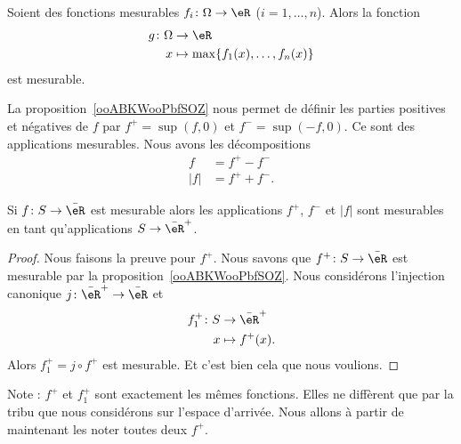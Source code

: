 \begin{lemma}   \label{LEMooMGUOooMGwknZ}
	Soient des fonctions mesurables \(f_i \colon \Omega\to \eR  \) (\( i=1,\ldots,n\)). Alors la fonction
	\begin{equation}
		\begin{aligned}
			g\colon \Omega & \to \eR                                \\
			x              & \mapsto \max\{ f_1(x),\ldots,f_n(x) \}
		\end{aligned}
	\end{equation}
	est mesurable.
\end{lemma}

\begin{normaltext}
	La proposition~\ref{ooABKWooPbfSOZ} nous permet de définir les parties positives et négatives de \( f\) par \( f^+=\sup(f,0)\) et \( f^-=\sup(-f,0)\). Ce sont des applications mesurables. Nous avons les décompositions
	\begin{subequations}
		\begin{align}
			f     & = f^+-f^-  \\
			| f | & = f^++f^-.
		\end{align}
	\end{subequations}
\end{normaltext}

\begin{corollary}       \label{CORooNXYUooEcvDlP}
	Si \( f\colon S\to \bar \eR\) est mesurable alors les applications \( f^+\), \( f^-\) et \( | f |\) sont mesurables en tant qu'applications \( S\to\bar \eR^+\).
\end{corollary}

\begin{proof}
	Nous faisons la preuve pour \( f^+\). Nous savons que \( f^+\colon S\to \bar \eR\) est mesurable par la proposition~\ref{ooABKWooPbfSOZ}. Nous considérons l'injection canonique \( j\colon \bar \eR^+\to \bar \eR\) et
	\begin{equation}
		\begin{aligned}
			f_1^+\colon S & \to \bar \eR^+  \\
			x             & \mapsto f^+(x).
		\end{aligned}
	\end{equation}
	Alors \( f_1^+=j\circ f^+\) est mesurable. Et c'est bien cela que nous voulions.

\end{proof}
Note : \( f^+\) et \( f_1^+\) sont exactement les mêmes fonctions. Elles ne diffèrent que par la tribu que nous considérons sur l'espace d'arrivée. Nous allons à partir de maintenant les noter toutes deux \( f^+\).

